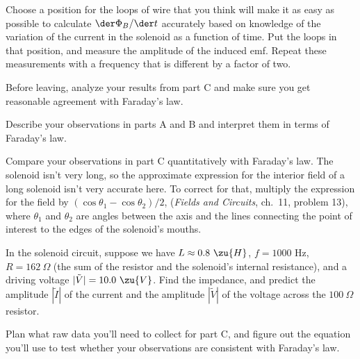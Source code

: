 Choose a position for the loops of wire that
you think will make it as easy as possible to calculate $\der \Phi_B/\der t$
accurately based on knowledge of the variation of the
current in the solenoid as a function of time. Put the loops
in that position, and measure the amplitude of the induced
emf. Repeat these measurements with a frequency that
is different by a factor of two.

\selfcheck

Before leaving, analyze your results from part C and make
sure you get reasonable agreement with Faraday's law.

\analysis

Describe your observations in parts A and B and interpret
them in terms of Faraday's law.

Compare your observations in part C quantitatively with Faraday's law.
The solenoid isn't very long, so the approximate expression for the
interior field of a long solenoid isn't very accurate here. To correct
for that, multiply the expression for the field by $(\cos\theta_1-\cos\theta_2)/2$,
(\emph{Fields and Circuits}, ch.~11, problem 13), where
$\theta_1$ and $\theta_2$ are angles between the axis and the lines connecting
the point of interest to the edges of the solenoid's mouths.

\prelab

\prelabquestion In the solenoid circuit, suppose we have $L\approx 0.8\ \zu{H}$,
$f=1000$ Hz, $R=162\ \Omega$ (the sum of the resistor and the solenoid's
internal resistance), and a driving voltage $|\tilde{V}|=10.0\ \zu{V}$.
Find the impedance, and predict the amplitude $|\tilde{I}|$ of
the current and the amplitude $|\tilde{V}|$ of the voltage across the $100\ \Omega$ resistor.

\prelabquestion  Plan what raw data you'll need to collect for part C,
and figure out the equation you'll use to test whether your
observations are consistent with Faraday's law.
